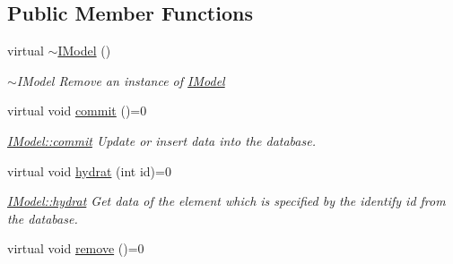 \subsection*{Public Member Functions}
\begin{DoxyCompactItemize}
\item 
\hypertarget{classModels_1_1IModel_ab9c12f5b9ae86e00d0f2f7d8d349c4fa}{virtual \hyperlink{classModels_1_1IModel_ab9c12f5b9ae86e00d0f2f7d8d349c4fa}{$\sim$\-I\-Model} ()}\label{classModels_1_1IModel_ab9c12f5b9ae86e00d0f2f7d8d349c4fa}

\begin{DoxyCompactList}\small\item\em $\sim$\-I\-Model Remove an instance of \hyperlink{classModels_1_1IModel}{I\-Model} \end{DoxyCompactList}\item 
\hypertarget{classModels_1_1IModel_ab4bc529739a8d243222212590888be45}{virtual void \hyperlink{classModels_1_1IModel_ab4bc529739a8d243222212590888be45}{commit} ()=0}\label{classModels_1_1IModel_ab4bc529739a8d243222212590888be45}

\begin{DoxyCompactList}\small\item\em \hyperlink{classModels_1_1IModel_ab4bc529739a8d243222212590888be45}{I\-Model\-::commit} Update or insert data into the database. \end{DoxyCompactList}\item 
virtual void \hyperlink{classModels_1_1IModel_a7ce6def437f5e1f6a78ee1d67ca028e4}{hydrat} (int id)=0
\begin{DoxyCompactList}\small\item\em \hyperlink{classModels_1_1IModel_a7ce6def437f5e1f6a78ee1d67ca028e4}{I\-Model\-::hydrat} Get data of the element which is specified by the identify {\itshape id} from the database. \end{DoxyCompactList}\item 
\hypertarget{classModels_1_1IModel_a290473739e709321c818f4451e05e619}{virtual void \hyperlink{classModels_1_1IModel_a290473739e709321c818f4451e05e619}{remove} ()=0}\label{classModels_1_1IModel_a290473739e709321c818f4451e05e619}


\end{DoxyCompactItemize}

